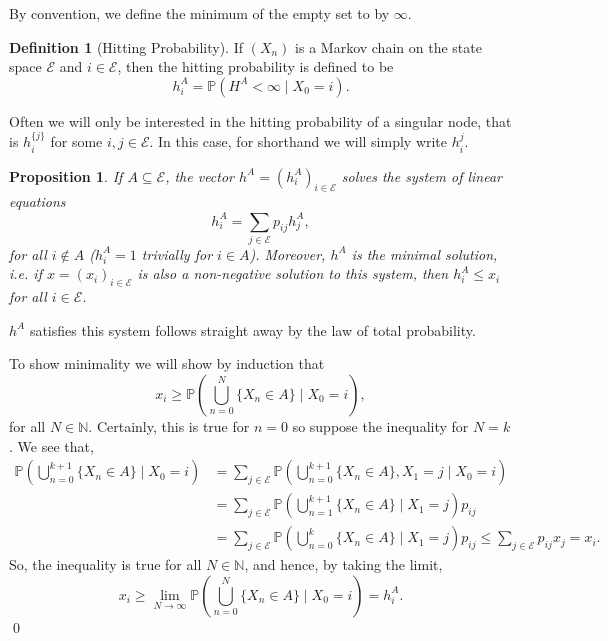 \documentclass[
]{article}
\newtheorem{prop}{Proposition}[theorem]
\theoremstyle{definition}
\newtheorem{definition}{Definition}[section]
\begin{document}
By convention, we define the minimum of the empty set to by \(\infty\).

\begin{definition}[Hitting Probability]
  If \((X_n)\) is a Markov chain on the state space \(\mathcal{E}\) and 
  \(i \in \mathcal{E}\), then the hitting probability is defined to be 
  \[h^A_i = \mathbb{P}(H^A < \infty \mid X_0 = i).\]
\end{definition}

Often we will only be interested in the hitting probability of a
singular node, that is \(h^{\{j\}}_i\) for some
\(i, j \in \mathcal{E}\). In this case, for shorthand we will simply
write \(h^j_i\).

\begin{prop}
  If \(A \subseteq \mathcal{E}\), the vector \(h^A = (h^A_i)_{i \in \mathcal{E}}\) 
  solves the system of linear equations 
  \[h^A_i = \sum_{j \in \mathcal{E}} p_{ij}h_j^A,\]
  for all \(i \not\in A\) (\(h^A_i = 1\) trivially for \(i \in A\)). Moreover, 
  \(h^A\) is the minimal solution, i.e. if \(x = (x_i)_{i \in \mathcal{E}}\) is also 
  a non-negative solution to this system, then \(h^A_i \le x_i\) for all 
  \(i \in \mathcal{E}\).
\end{prop}
\proof

\(h^A\) satisfies this system follows straight away by the law of total
probability.

To show minimality we will show by induction that
\[x_i \ge \mathbb{P}\left(\bigcup_{n = 0}^N \{X_n \in A\} \mid X_0 = i\right),\]
for all \(N \in \mathbb{N}\). Certainly, this is true for \(n = 0\) so
suppose the inequality for \(N = k\). We see that, \begin{align*}
    \mathbb{P}\left(\bigcup_{n = 0}^{k + 1} \{X_n \in A\} \mid X_0 = i \right) 
      & = \sum_{j \in \mathcal{E}} \mathbb{P}\left(\bigcup_{n = 0}^{k + 1} \{X_n \in A\}, X_1 = j \mid X_0 = i \right) \\
      & = \sum_{j \in \mathcal{E}} \mathbb{P}\left(\bigcup_{n = 1}^{k + 1} \{X_n \in A\} \mid X_1 = j\right)p_{ij} \\
      & = \sum_{j \in \mathcal{E}} \mathbb{P}\left(\bigcup_{n = 0}^{k} \{X_n \in A\} \mid X_1 = j\right)p_{ij} 
        \le \sum_{j \in \mathcal{E}}p_{ij} x_j = x_i.
  \end{align*} So, the inequality is true for all \(N \in \mathbb{N}\),
and hence, by taking the limit, \[x_i \ge \lim_{N \to \infty} \mathbb{P}
    \left(\bigcup_{n = 0}^N \{X_n \in A\} \mid X_0 = i\right) = h^A_i.\]
\qed
\end{document}
